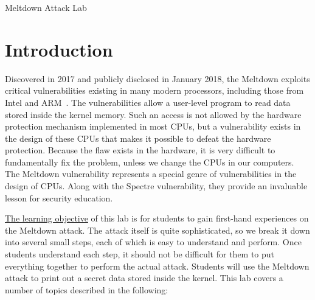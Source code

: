 
\newcommand{\commonfolder}{../../common-files}






\newcommand{\meltdownFigs}{./Figs}




\begin{center}
{\LARGE Meltdown Attack Lab}
\end{center}



\section{Introduction}

Discovered in 2017 and publicly disclosed in January 2018, the Meltdown
exploits critical vulnerabilities existing in many modern processors,
including those from Intel and ARM~\cite{Lipp2018meltdown}. 
The vulnerabilities allow a user-level
program to read data stored inside the kernel memory. Such an access is not
allowed by the hardware protection mechanism implemented in most CPUs, but
a vulnerability exists in the design of these CPUs that makes it possible
to defeat the hardware protection. Because the flaw exists in the hardware,
it is very difficult to fundamentally fix the problem, unless we change the
CPUs in our computers. The Meltdown vulnerability represents a special
genre of vulnerabilities in the design of CPUs. Along with the Spectre
vulnerability, they provide an invaluable lesson for security education.


\underline{The learning objective} of this lab is for students to gain first-hand
experiences on the Meltdown attack. The attack itself is quite
sophisticated, so we break it down into several small steps, each of which
is easy to understand and perform.  Once students understand each step, it
should not be difficult for them to put everything together to perform the
actual attack. Students will use the Meltdown attack to print out a 
secret data stored inside the kernel. This lab covers a number of topics 
described in the following: 

